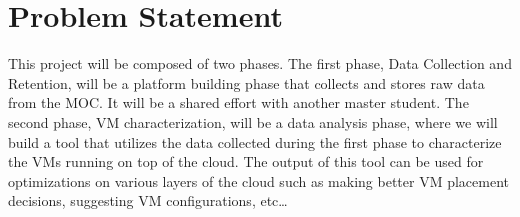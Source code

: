 \section{Problem Statement}
\label{sec:ProblemStatement}

%

This project will be composed of two phases. The first phase, Data Collection and Retention, will be a platform building phase that collects and stores raw data from the MOC. It will be a shared effort with another master student. The second phase, VM characterization, will be a data analysis phase, where we will build a tool that utilizes the data collected during the first phase to characterize the VMs running on top of the cloud. The output of this tool can be used for optimizations on various layers of the cloud such as making better VM placement decisions, suggesting VM configurations, etc…  





